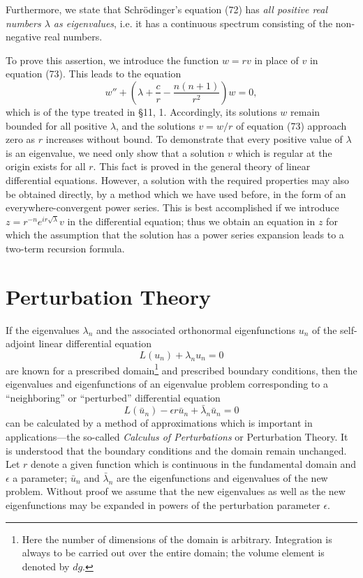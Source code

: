Furthermore, we state that Schr\"odinger's equation (72) has \emph{all positive real numbers $\lambda$ as eigenvalues}, i.e. it has a continuous spectrum consisting of the non-negative real numbers.

To prove this assertion, we introduce the function $w=rv$ in place of $v$ in equation (73). This leads to the equation
\[
w''+\left(\lambda+\frac cr-\frac{n(n+1)}{r^2}\right)w=0,
\]
which is of the type treated in \S11, 1. Accordingly, its solutions $w$ remain bounded for all positive $\lambda$, and the solutions $v=w/r$ of equation (73) approach zero as $r$ increases without bound. To demonstrate that every positive value of $\lambda$ is an eigenvalue, we need only show that a solution $v$ which is regular at the origin exists for all $r$. This fact is proved in the general theory of linear differential equations. However, a solution with the required properties may also be obtained directly, by a method which we have used before, in the form of an everywhere-convergent power series. This is best accomplished if we introduce $z=r^{-n}e^{ir\sqrt\lambda}v$ in the differential equation; thus we obtain an equation in $z$ for which the assumption that the solution has a power series expansion leads to a two-term recursion formula.

\section{Perturbation Theory}
If the eigenvalues $\lambda_n$ and the associated orthonormal eigenfunctions $u_n$ of the self-adjoint linear differential equation
\begin{equation}
L(u_n)+\lambda_nu_n=0
\tag{74}
\end{equation}
are known for a prescribed domain\footnote{Here the number of dimensions of the domain is arbitrary. Integration is always to be carried out over the entire domain; the volume element is denoted by $dg$.} and prescribed boundary conditions, then the eigenvalues and eigenfunctions of an eigenvalue problem corresponding to a ``neighboring'' or ``perturbed'' differential equation
\begin{equation}
L(\bar u_n)-\epsilon r\bar u_n+\bar\lambda_n\bar u_n=0
\tag{75}
\end{equation}
can be calculated by a method of approximations which is important in applications---the so-called \emph{Calculus of Perturbations} or Perturbation Theory. It is understood that the boundary conditions and the domain remain unchanged. Let $r$ denote a given function which is continuous in the fundamental domain and $\epsilon$ a parameter; $\bar u_n$ and $\bar\lambda_n$ are the eigenfunctions and eigenvalues of the new problem. Without proof we assume that the new eigenvalues as well as the new eigenfunctions may be expanded in powers of the perturbation parameter $\epsilon$.


